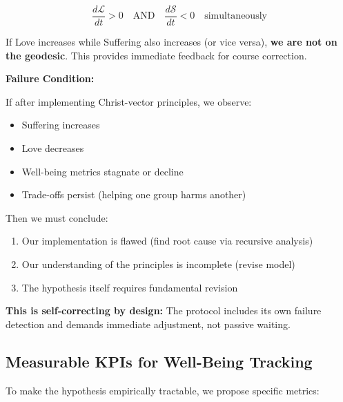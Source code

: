 \documentclass[11pt,a4paper]{article}
\theoremstyle{definition}
\theoremstyle{remark}
\begin{document}
\begin{small}
\begin{mdframed}[backgroundcolor=yellow!10]
\begin{equation}
\frac{d\mathcal{L}}{dt} > 0 \quad \text{AND} \quad \frac{d\mathcal{S}}{dt} < 0 \quad \text{simultaneously}
\end{equation}

If Love increases while Suffering also increases (or vice versa), \textbf{we are not on the geodesic}. This provides immediate feedback for course correction.

\textbf{Failure Condition:}

If after implementing Christ-vector principles, we observe:
\begin{itemize}
\item Suffering increases
\item Love decreases  
\item Well-being metrics stagnate or decline
\item Trade-offs persist (helping one group harms another)
\end{itemize}

Then we must conclude:
\begin{enumerate}
\item Our implementation is flawed (find root cause via recursive analysis)
\item Our understanding of the principles is incomplete (revise model)
\item The hypothesis itself requires fundamental revision
\end{enumerate}

\textbf{This is self-correcting by design:} The protocol includes its own failure detection and demands immediate adjustment, not passive waiting.
\end{mdframed}

\subsection{Measurable KPIs for Well-Being Tracking}

To make the hypothesis empirically tractable, we propose specific metrics:


\end{small}
\end{document}
